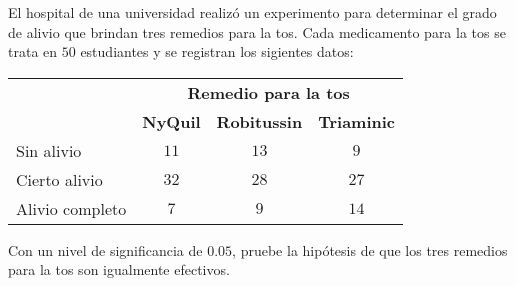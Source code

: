 \begin{enunciado}
 El hospital de una universidad realiz\'o un experimento para determinar el grado de alivio que brindan tres remedios para la tos.
 Cada medicamento para la tos se trata en $50$ estudiantes y se registran los sigientes datos:
 \begin{center}
  \begin{tabular}{lccc}
   & \multicolumn{3}{c}{\textbf{Remedio para la tos}} \\
   & \textbf{NyQuil} & \textbf{Robitussin} & \textbf{Triaminic} \\
   \hline 
   Sin alivio & $11$ & $13$ & $9$ \\
   Cierto alivio & $32$ & $28$ & $27$ \\
   Alivio completo & $7$ & $9$ & $14$
  \end{tabular}
 \end{center}
 Con un nivel de significancia de $0.05$, pruebe la hip\'otesis de que los tres remedios para la tos son igualmente efectivos.
\end{enunciado}

